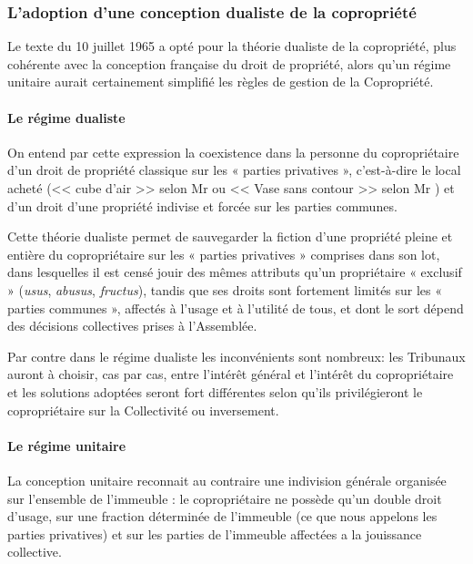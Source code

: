 		\subsubsection{L’adoption d’une conception dualiste de la copropriété}
		
			Le texte du 10 juillet 1965 a opté pour la théorie dualiste de la copropriété, plus cohérente avec la conception française du droit de propriété, alors qu'un régime unitaire aurait certainement simplifié les règles de gestion de la Copropriété.
			
			\paragraph{Le régime dualiste}
				On entend par cette expression la coexistence dans la personne du copropriétaire d’un droit de propriété classique sur les « parties privatives », c'est-à-dire le local acheté (<< cube d'air >> selon Mr  ou << Vase sans contour >> selon Mr ) et d’un droit d’une propriété indivise et forcée sur les parties communes.
				
				Cette théorie dualiste permet de sauvegarder la fiction d’une propriété pleine et entière du copropriétaire sur les « parties privatives » comprises dans son lot, dans lesquelles il est censé jouir des mêmes attributs qu’un propriétaire « exclusif » (\emph{usus}, \emph{abusus}, \emph{fructus}), tandis que ses droits sont fortement limités sur les « parties communes », affectés à l’usage et à l’utilité de tous, et dont le sort dépend des décisions collectives prises à l’Assemblée.
			
				Par contre dans le régime dualiste les inconvénients sont nombreux: les Tribunaux auront à choisir, cas par cas, entre l'intérêt général et l'intérêt du copropriétaire et les solutions adoptées seront fort différentes selon qu'ils privilégieront le copropriétaire sur la Collectivité ou inversement.
			
			\paragraph{Le régime unitaire}
				La conception unitaire reconnait au contraire une indivision générale organisée sur l’ensemble de l’immeuble : le copropriétaire ne possède qu'un double droit d'usage, sur une fraction déterminée de l'immeuble (ce que nous appelons les parties privatives) et sur les parties de l'immeuble affectées a la jouissance collective.
				
